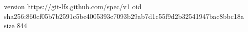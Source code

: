 version https://git-lfs.github.com/spec/v1
oid sha256:860cf05b7b2591c5bc4005393c7093b29ab7d1c55f9d2b32541947bac8bbc18a
size 844
